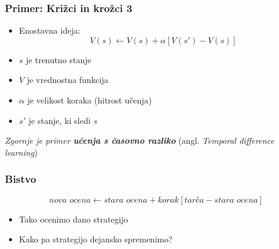 \documentclass{beamer}    %
\begin{document}
\begin{frame}
    \frametitle{Primer: Križci in krožci 3}
    \begin{itemize}
        \item Enostavna ideja:                                  
        $$
        V(s) \leftarrow V(s) + \alpha [V(s') - V(s)]
        $$
        \pause
        \item $s$ je trenutno stanje                     
        \pause
        \item $V$ je vrednostna funkcija                 
        \pause
        \item $\alpha$ je velikost koraka (hitrost učenja) 
        \pause
        \item $s'$ je stanje, ki sledi \textit{s}   
    \end{itemize}
    \medskip
    \emph{Zgornje je primer \textbf{učenja s časovno razliko}} (angl. \textit{Temporal difference learning})
\end{frame}


\begin{frame}
    \frametitle{Bistvo}
    $$
    \textit{nova ocena} \leftarrow \textit{stara ocena} + \textit{korak} 
    [\textit{tarča} - \textit{stara ocena}]
    $$
    \medskip
    \begin{itemize}
        \item Tako ocenimo dano strategijo
        \item Kako pa strategijo dejansko spremenimo?
    \end{itemize}
\end{frame}
\end{document}
